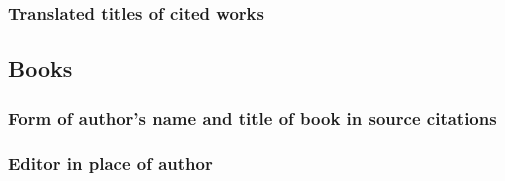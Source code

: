 \documentclass[11pt,letterpaper,oneside]{article}
\begin{document}
\setcounter{subsubsection}{98}
\subsubsection{Translated titles of cited works}

\begin{citebib}
\item \cite[272]{kern1938}
\item \cite{pirumova1977b}
\item \cite{furet1999}
\end{citebib}

\setcounter{subsection}{4}
\subsection{Books}
\setcounter{subsection}{14}

\setcounter{subsubsection}{100}
\subsubsection{Form of author’s name and title of book in source citations}

\begin{citebib}
\item \cite[79--80]{gawande2014}
\item \cite[191]{gawande2014}
\end{citebib}

\setcounter{subsubsection}{102}
\subsubsection{Editor in place of author}
\label{14.103}

\begin{citebib}
\item \cite[100]{egan2014}
\item \cite[33]{schechter2011}
\item \cite[34]{silverstein1974}
\item \cite[301--2]{egan2014}
\item \cite[54--56]{schechter2011}
\item \cite[38]{silverstein1974}
\end{citebib}
\end{document}
